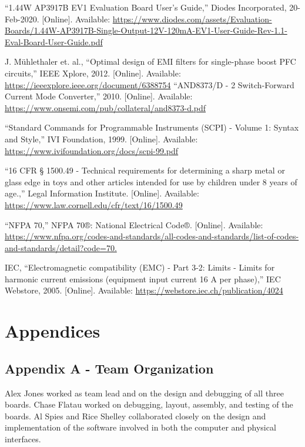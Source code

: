 \documentclass[15pt]{article}
\begin{document}
\begin{thebibliography}{}
    “1.44W AP3917B EV1 Evaluation Board User’s Guide,” Diodes Incorporated, 20-Feb-2020. [Online]. Available: \url{https://www.diodes.com/assets/Evaluation-Boards/1.44W-AP3917B-Single-Output-12V-120mA-EV1-User-Guide-Rev-1.1-Eval-Board-User-Guide.pdf}

    J. Mühlethaler et. al., “Optimal design of EMI filters for single-phase boost PFC circuits,” IEEE Xplore, 2012. [Online]. Available: 
    \url{https://ieeexplore.ieee.org/document/6388754}
    “AND8373/D - 2 Switch-Forward Current Mode Converter,” 2010. [Online]. Available: \url{https://www.onsemi.com/pub/collateral/and8373-d.pdf}

    “Standard Commands for Programmable Instruments (SCPI) - Volume 1: Syntax and Style,” IVI Foundation, 1999. [Online]. Available: \url{https://www.ivifoundation.org/docs/scpi-99.pdf}

    “16 CFR § 1500.49 - Technical requirements for determining a sharp metal or glass edge in toys and other articles intended for use by children under 8 years of age.,” Legal Information Institute. [Online]. Available: \url{https://www.law.cornell.edu/cfr/text/16/1500.49}
    
    “NFPA 70,” NFPA 70®: National Electrical Code®. [Online]. Available: \url{https://www.nfpa.org/codes-and-standards/all-codes-and-standards/list-of-codes-and-standards/detail?code=70.} 
    
    IEC, “Electromagnetic compatibility (EMC) - Part 3-2: Limits - Limits for harmonic current emissions (equipment input current 16 A per phase),” IEC Webstore, 2005. [Online]. Available:
    \url{https://webstore.iec.ch/publication/4024}
\end{thebibliography}
\endgroup
\pagebreak
\section{Appendices}
\subsection{Appendix A - Team Organization}
Alex Jones worked as team lead and on the design and debugging of all three boards. Chase Flatau worked on debugging, layout, assembly, and testing of the boards. Al Spies and Rice Shelley collaborated closely on the design and implementation of the software involved in both the computer and physical interfaces.
\end{document}
